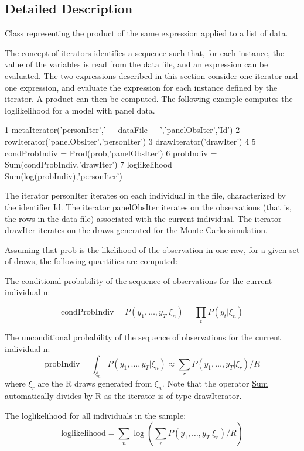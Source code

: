 \subsection{Detailed Description}
Class representing the product of the same expression applied to a list of data. 

The concept of iterators identifies a sequence such that, for each instance, the value of the variables is read from the data file, and an expression can be evaluated. The two expressions described in this section consider one iterator and one expression, and evaluate the expression for each instance defined by the iterator. A product can then be computed. The following example computes the loglikelihood for a model with panel data. 
\begin{DoxyCode}
1 metaIterator(\textcolor{stringliteral}{'personIter'},\textcolor{stringliteral}{'\_\_dataFile\_\_'},\textcolor{stringliteral}{'panelObsIter'},\textcolor{stringliteral}{'Id'})
2 rowIterator(\textcolor{stringliteral}{'panelObsIter'},\textcolor{stringliteral}{'personIter'})
3 drawIterator(\textcolor{stringliteral}{'drawIter'})
4 
5 condProbIndiv = Prod(prob,\textcolor{stringliteral}{'panelObsIter'})
6 probIndiv = Sum(condProbIndiv,\textcolor{stringliteral}{'drawIter'})
7 loglikelihood = Sum(log(probIndiv),\textcolor{stringliteral}{'personIter'})
\end{DoxyCode}
 The iterator person\+Iter iterates on each individual in the file, characterized by the identifier Id. The iterator panel\+Obs\+Iter iterates on the observations (that is, the rows in the data file) associated with the current individual. The iterator draw\+Iter iterates on the draws generated for the Monte-\/\+Carlo simulation.

Assuming that prob is the likelihood of the observation in one raw, for a given set of draws, the following quantities are computed\+:
\begin{DoxyItemize}
\item The conditional probability of the sequence of observations for the current individual n\+:
\end{DoxyItemize}

\[ \mbox{condProbIndiv} = P(y_1,\ldots,y_T|\xi_n) = \prod_t P(y_t|\xi_n)\]


\begin{DoxyItemize}
\item The unconditional probability of the sequence of observations for the current individual n\+: \[ \mbox{probIndiv} = \int_{\xi_n}P(y_1,\ldots,y_T|\xi_n) \approx \sum_r P(y_1,\ldots,y_T|\xi_r) / R \] where $\xi_r$ are the R draws generated from $\xi_n$. Note that the operator \hyperlink{classbio__expression_1_1_sum}{Sum} automatically divides by R as the iterator is of type draw\+Iterator.
\item The loglikelihood for all individuals in the sample\+: \[ \mbox{loglikelihood} = \sum_n \log(\sum_r P(y_1,\ldots,y_T|\xi_r) / R) \] 
\end{DoxyItemize}

